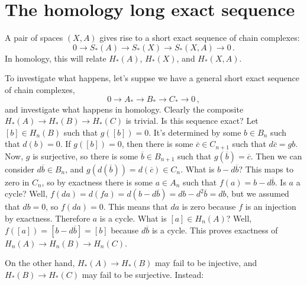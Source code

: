 \section{The homology long exact sequence}

A pair of spaces $(X,A)$ gives rise to a short exact sequence of chain 
complexes:
\[
0\to S_*(A)\to S_*(X)\to S_*(X,A)\to0\,.
\]
In homology, this will relate $H_*(A)$, $H_*(X)$, and $H_*(X,A)$. 

To investigate what happens, let's suppse we have a general short exact 
sequence of chain complexes,
\[
0\to A_*\to B_*\to C_*\to0\,,
\]
and investigate what happens in homology. 
Clearly the composite $H_*(A)\to H_*(B)\to H_*(C)$ is trivial. Is this sequence
exact?  
Let $[b]\in H_n(B)$ such that $g([b])=0$. It's determined by some $b\in B_n$ such that $d(b)=0$. If $g([b])=0$, then there is some $\overline{c}\in C_{n+1}$ such that $d\overline{c}=gb$. Now, $g$ is surjective, so there is some $\overline{b}\in B_{n+1}$ such that $g(\overline{b})=\overline{c}$. Then we can consider $d\overline{b}\in B_n$, and $g(d(\overline{b}))=d(\overline{c})\in C_n$. What is $b-d\overline{b}$? This maps to zero in $C_n$, so by exactness there is some $a\in A_n$ such that $f(a)=b-d\overline{b}$. Is $a$ a cycle? Well, $f(da)=d(fa)=d(b-d\overline{b})=db-d^2\overline{b}=db$, but we assumed that $db=0$, so $f(da)=0$. This means that $da$ is zero because $f$ is an injection by exactness. Therefore $a$ is a cycle. What is $[a]\in H_n(A)$? Well, $f([a])=[b-d\overline{b}]=[b]$ because $d\overline{b}$ is a cycle. This proves exactness of $ H_n(A)\to H_n(B)\to H_n(C)$.

On the other hand, $H_*(A)\to H_*(B)$ may fail to be injective, and 
$H_*(B)\to H_*(C)$ may fail to be surjective. Instead:

